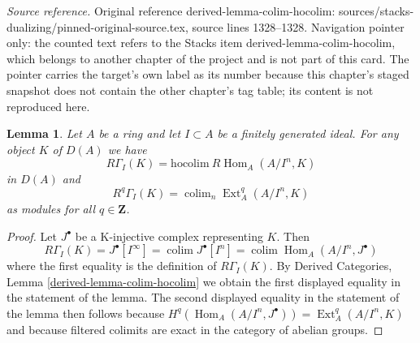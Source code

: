 \documentclass[10pt,a4paper]{amsart}
\theoremstyle{plain}
\newtheorem{lemma}[subsection]{Lemma}
\theoremstyle{definition}
\theoremstyle{remark}
\numberwithin{equation}{subsection}
\def\colim{\mathop{\mathrm{colim}}\nolimits}
\def\Hom{\mathop{\mathrm{Hom}}\nolimits}
\def\Ext{\mathop{\mathrm{Ext}}\nolimits}
\begin{document}
\noindent\textit{Source reference.} Original reference derived-lemma-colim-hocolim: sources/stacks-dualizing/pinned-original-source.tex, source lines 1328--1328. Navigation pointer only: the counted text refers to the Stacks item derived-lemma-colim-hocolim, which belongs to another chapter of the project and is not part of this card. The pointer carries the target's own label as its number because this chapter's staged snapshot does not contain the other chapter's tag table; its content is not reproduced here.\par\medskip
\begin{lemma}
\label{lemma-local-cohomology-ext}
Let $A$ be a ring and let $I \subset A$ be a finitely generated ideal.
For any object $K$ of $D(A)$ we have
$$
R\Gamma_I(K) = \text{hocolim}\ R\Hom_A(A/I^n, K)
$$
in $D(A)$ and
$$
R^q\Gamma_I(K) = \colim_n \Ext_A^q(A/I^n, K)
$$
as modules for all $q \in \mathbf{Z}$.
\end{lemma}

\begin{proof}
Let $J^\bullet$ be a K-injective complex representing $K$. Then
$$
R\Gamma_I(K) = J^\bullet[I^\infty] = \colim J^\bullet[I^n] =
\colim \Hom_A(A/I^n, J^\bullet)
$$
where the first equality is the definition of $R\Gamma_I(K)$.
By Derived Categories, Lemma \ref{derived-lemma-colim-hocolim}
we obtain the first displayed equality in the statement of the lemma.
The second displayed equality in the statement of the lemma then
follows because $H^q(\Hom_A(A/I^n, J^\bullet)) = \Ext^q_A(A/I^n, K)$
and because filtered colimits are exact in the category of abelian
groups.
\end{proof}
\end{document}

